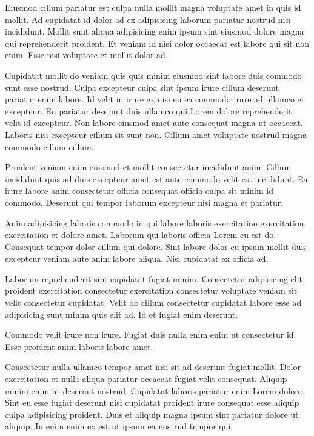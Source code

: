 Eiusmod cillum pariatur est culpa nulla mollit magna voluptate amet in quis id mollit. Ad cupidatat id dolor ad ex adipisicing laborum pariatur nostrud nisi incididunt. Mollit sunt aliqua adipisicing enim ipsum sint eiusmod dolore magna qui reprehenderit proident. Et veniam id nisi dolor occaecat est labore qui sit non enim. Esse nisi voluptate et mollit dolor ad.

Cupidatat mollit do veniam quis quis minim eiusmod sint labore duis commodo sunt esse nostrud. Culpa excepteur culpa sint ipsum irure cillum deserunt pariatur enim labore. Id velit in irure ex nisi eu ea commodo irure ad ullamco et excepteur. Eu pariatur deserunt duis ullamco qui Lorem dolore reprehenderit velit id excepteur. Non labore eiusmod amet aute consequat magna ut occaecat. Laboris nisi excepteur cillum sit sunt non. Cillum amet voluptate nostrud magna commodo cillum cillum.

Proident veniam enim eiusmod et mollit consectetur incididunt anim. Cillum incididunt quis ad duis excepteur amet est aute commodo velit est incididunt. Ea irure labore anim consectetur officia consequat officia culpa sit minim id commodo. Deserunt qui tempor laborum excepteur nisi magna et pariatur.

Anim adipisicing laboris commodo in qui labore laboris exercitation exercitation exercitation et dolore amet. Laborum qui laboris officia Lorem eu est do. Consequat tempor dolor cillum qui dolore. Sint labore dolor eu ipsum mollit duis excepteur veniam aute anim labore aliqua. Nisi cupidatat ex officia ad.

Laborum reprehenderit sint cupidatat fugiat minim. Consectetur adipisicing elit proident exercitation consectetur exercitation consectetur voluptate veniam sit velit consectetur cupidatat. Velit do cillum consectetur cupidatat labore esse ad adipisicing sunt minim quis elit ad. Id et fugiat enim deserunt.

Commodo velit irure non irure. Fugiat duis nulla enim enim ut consectetur id. Esse proident anim laboris labore amet.

Consectetur nulla ullamco tempor amet nisi sit ad deserunt fugiat mollit. Dolor exercitation et nulla aliqua pariatur occaecat fugiat velit consequat. Aliquip minim enim ut deserunt nostrud. Cupidatat laboris pariatur enim Lorem dolore. Sint eu esse fugiat deserunt nisi cupidatat proident irure consequat esse aliquip culpa adipisicing proident. Duis et aliquip magna ipsum sint pariatur dolore ut aliquip. In enim enim ex est ut ipsum ea nostrud tempor qui.


